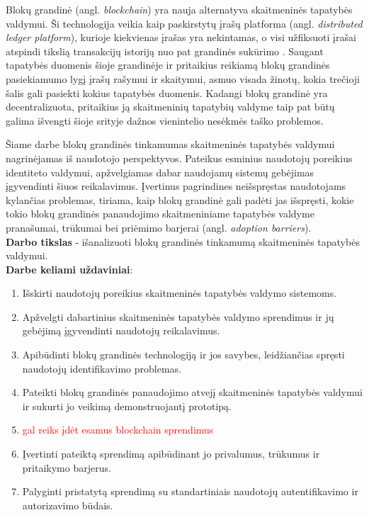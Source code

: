 Blokų grandinė (angl. \textit{blockchain}) yra nauja alternatyva skaitmeninės tapatybės valdymui. Ši technologija veikia kaip
paskirstytų įrašų platforma (angl. \textit{distributed ledger platform}), kurioje kiekvienas įrašas yra nekintamas, o visi
užfiksuoti įrašai atspindi tikslią transakcijų istoriją nuo pat grandinės sukūrimo \cite{Baars2016}. Saugant tapatybės duomenis šioje grandinėje ir
pritaikius reikiamą blokų grandinės pasiekiamumo lygį įrašų rašymui ir skaitymui, asmuo visada
žinotų, kokia trečioji šalis gali pasiekti kokius tapatybės duomenis. Kadangi blokų grandinė yra decentralizuota, pritaikius ją skaitmeninių tapatybių valdyme taip pat
būtų galima išvengti šioje srityje dažnos vienintelio nesėkmės taško problemos. 

Šiame darbe blokų grandinės tinkamumas skaitmeninės tapatybės valdymui nagrinėjamas iš naudotojo perspektyvos.
Pateikus esminius naudotojų poreikius identiteto valdymui,
apžvelgiamas dabar naudojamų sistemų gebėjimas įgyvendinti šiuos reikalavimus. Įvertinus pagrindines neišspręstas naudotojams kylančias problemas,
tiriama, kaip blokų grandinė gali padėti jas išspręsti, kokie tokio blokų grandinės panaudojimo skaitmeniniame tapatybės valdyme
pranašumai, trūkumai bei priėmimo barjerai (angl. \textit{adoption barriers}).
\\

\textbf{Darbo tikslas} - išanalizuoti blokų grandinės tinkamumą skaitmeninės tapatybės valdymui.
\\

\textbf{Darbe keliami uždaviniai}:

\begin{enumerate}
    \item Išskirti naudotojų poreikius skaitmeninės tapatybės valdymo sistemoms.
    \item Apžvelgti dabartinius skaitmeninės tapatybės valdymo sprendimus ir jų gebėjimą
    įgyvendinti naudotojų reikalavimus.
    \item Apibūdinti blokų grandinės technologiją ir jos savybes, leidžiančias spręsti naudotojų identifikavimo problemas.
    \item Pateikti blokų grandinės panaudojimo atvejį skaitmeninės tapatybės valdymui ir sukurti jo veikimą demonstruojantį prototipą.
    \item \textcolor{red}{gal reiks įdėt esamus blockchain sprendimus}
    \item Įvertinti pateiktą sprendimą apibūdinant jo privalumus, trūkumus ir pritaikymo barjerus.
    \item Palyginti pristatytą sprendimą su standartiniais naudotojų autentifikavimo ir autorizavimo būdais.
\end{enumerate}